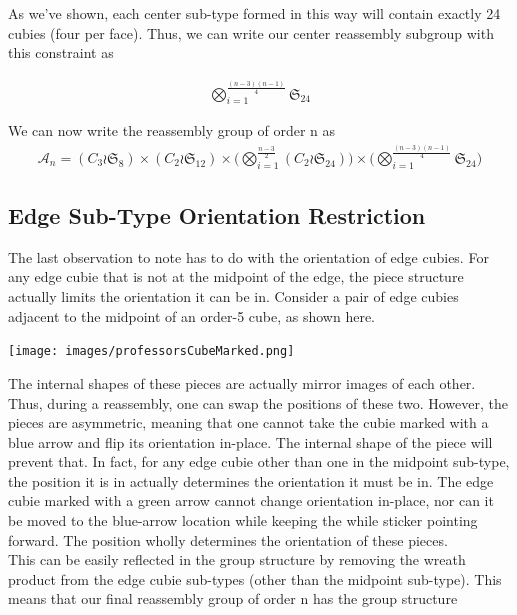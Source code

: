 \documentclass[10pt,letterpaper]{report}
\begin{document}
As we've shown, each center sub-type formed in this way will contain exactly 24 cubies (four per face).  Thus, we can write our center reassembly subgroup with this constraint as

\begin{align*}
\bigotimes_{i=1}^{\frac{(n-3)(n-1)}{4}}\mathfrak{S}_{24}
\end{align*}

We can now write the reassembly group of order n as \begin{align*}
\mathcal{A}_n = (C_3 \wr \mathfrak{S}_8) \times (C_2 \wr \mathfrak{S}_{12}) \times \Big( \bigotimes_{i=1}^{\frac{n-3}{2}} (C_2 \wr \mathfrak{S}_{24}) \Big) \times \Big( \bigotimes_{i=1}^{\frac{(n-3)(n-1)}{4}}\mathfrak{S}_{24} \Big)
\end{align*}

\subsection{Edge Sub-Type Orientation Restriction}
The last observation to note has to do with the orientation of edge cubies.  For any edge cubie that is not at the midpoint of the edge, the piece structure actually limits the orientation it can be in.  Consider a pair of edge cubies adjacent to the midpoint of an order-5 cube, as shown here.

\begin{center}
\texttt{[image: images/professorsCubeMarked.png]} 
\end{center}

The internal shapes of these pieces are actually mirror images of each other.  Thus, during a reassembly, one can swap the positions of these two.  However, the pieces are asymmetric, meaning that one cannot take the cubie marked with a blue arrow and flip its orientation in-place.  The internal shape of the piece will prevent that.  In fact, for any edge cubie other than one in the midpoint sub-type, the position it is in actually determines the orientation it must be in.  The edge cubie marked with a green arrow cannot change orientation in-place, nor can it be moved to the blue-arrow location while keeping the while sticker pointing forward.  The position wholly determines the orientation of these pieces. \\

This can be easily reflected in the group structure by removing the wreath product from the edge cubie sub-types (other than the midpoint sub-type).  This means that our final reassembly group of order n has the group structure
\end{document}
